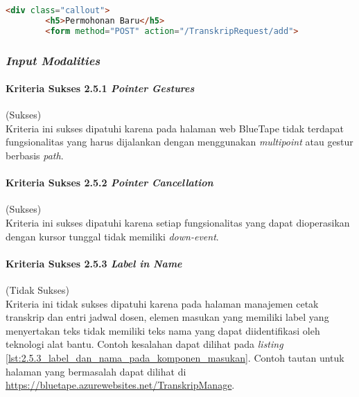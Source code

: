\begin{lstlisting}[frame=single, label={lst:2.4.10_heading_tidak_tepat}, language=HTML, caption=Kriteria Sukses 2.4.10 - Penggunaan \textit{Heading} Tidak Tepat]
    <div class="callout">
        <h5>Permohonan Baru</h5>
        <form method="POST" action="/TranskripRequest/add">
\end{lstlisting}

\subsubsection{\textit{Input Modalities}}
\label{subsubsec:kepatuhan_bluetape_input_modalities}

\paragraph{Kriteria Sukses 2.5.1 \textit{Pointer Gestures}}
\label{par:kepatuhan_bluetape_kriteria_sukses_2.5.1}
(Sukses)\\

Kriteria ini sukses dipatuhi karena pada halaman web BlueTape tidak terdapat fungsionalitas yang harus dijalankan dengan menggunakan \textit{multipoint} atau gestur berbasis \textit{path}.

\paragraph{Kriteria Sukses 2.5.2 \textit{Pointer Cancellation}}
\label{par:kepatuhan_bluetape_kriteria_sukses_2.5.2}
(Sukses)\\

Kriteria ini sukses dipatuhi karena setiap fungsionalitas yang dapat dioperasikan dengan kursor tunggal tidak memiliki \textit{down-event}.

\paragraph{Kriteria Sukses 2.5.3 \textit{Label in Name}}
\label{par:kepatuhan_bluetape_kriteria_sukses_2.5.3}
(Tidak Sukses)\\

Kriteria ini tidak sukses dipatuhi karena pada halaman manajemen cetak transkrip dan entri jadwal dosen, elemen masukan yang memiliki label yang menyertakan teks tidak memiliki teks nama yang dapat diidentifikasi oleh teknologi alat bantu. Contoh kesalahan dapat dilihat pada \textit{listing} \ref{lst:2.5.3_label_dan_nama_pada_komponen_masukan}. Contoh tautan untuk halaman yang bermasalah dapat dilihat di \url{https://bluetape.azurewebsites.net/TranskripManage}.

